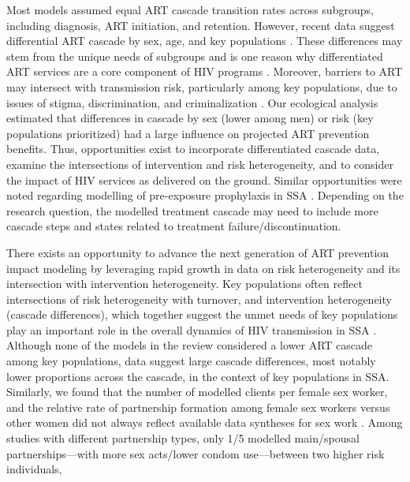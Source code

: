 Most models assumed equal ART cascade transition rates across subgroups,
including diagnosis, ART initiation, and retention.
However, recent data suggest differential ART cascade by sex, age, and key populations
\cite{Lancaster2016,Stannah2019,Ma2020,Green2020}.
These differences may stem from the unique needs of subgroups
and is one reason why differentiated ART services are a core component of HIV programs
\cite{Chikwari2018,Ehrenkranz2019}.
Moreover, barriers to ART may intersect with transmission risk, particularly among key populations,
due to issues of stigma, discrimination, and criminalization \cite{Ortblad2019,Baral2019}.
Our ecological analysis estimated that  %
differences in cascade by sex (lower among men) or risk (key populations prioritized)
had a large influence on projected ART prevention benefits.
Thus, opportunities exist to incorporate differentiated cascade data,
examine the intersections of intervention and risk heterogeneity, and
to consider the impact of HIV services as delivered on the ground.
Similar opportunities were noted regarding modelling of pre-exposure prophylaxis in SSA \cite{Case2019}.
Depending on the research question, the modelled treatment cascade may need
to include more cascade steps and states related to treatment failure/discontinuation.
\par
There exists an opportunity to advance the next generation of ART prevention impact modeling by leveraging rapid
growth in data on risk heterogeneity and its intersection with intervention heterogeneity.  %
Key populations often reflect intersections of risk heterogeneity with turnover, and intervention heterogeneity (cascade differences), which
together suggest the unmet needs of key populations play an important role in the overall dynamics of HIV transmission in SSA \cite{Bekker2015,Stone2021}.
Although none of the models in the review considered a lower ART cascade among key populations, data suggest large cascade differences, most notably lower proportions across the cascade, in the context of key populations in SSA. %
Similarly, we found that the number of modelled clients per female sex worker, and
the relative rate of partnership formation among female sex workers versus other women
did not always reflect available data syntheses for sex work \cite{Watts2010,Scorgie2012}.
Among studies with different partnership types, only 1/5 modelled
main/spousal partnerships---with more sex acts/lower condom use---between two higher risk individuals,
